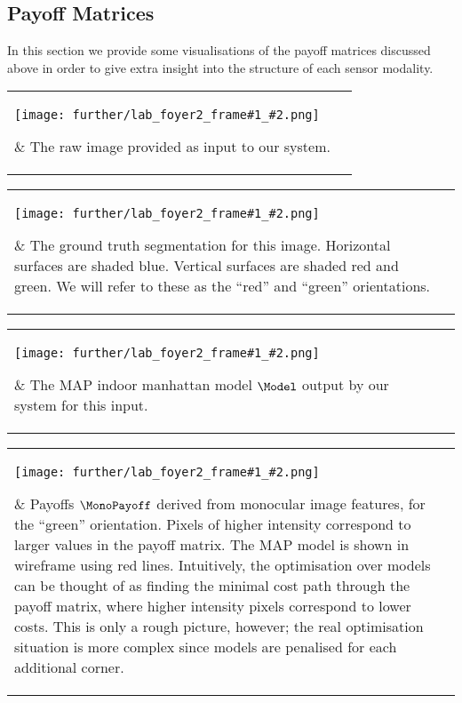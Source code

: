 \subsection{Payoff Matrices}

In this section we provide some visualisations of the payoff matrices
discussed above in order to give extra insight into the structure of
each sensor modality.

\newcommand\FooPayoffImg[2]{
        \parbox[c]{1em}{
                \texttt{[image: further/lab\_foyer2\_frame\#1\_\#2.png]}}}
\newcommand\PayoffImg[1]{\FooPayoffImg{010}{#1}}


\begin{tabular}{IT}
  \PayoffImg{orig} &
  The raw image provided as input to our system. \\
\end{tabular}
\qquad

\begin{tabular}{IT}
  \PayoffImg{gt} &
  The ground truth segmentation for this image. Horizontal surfaces
  are shaded blue. Vertical surfaces are shaded red and green. We will
  refer to these as the ``red'' and ``green'' orientations.\\
\end{tabular}
\qquad

\begin{tabular}{IT}
  \PayoffImg{dp} &
  The MAP indoor manhattan model $\Model$ output by our system for
  this input. \\
\end{tabular}
\qquad

\begin{tabular}{IT}
  \PayoffImg{monopayoffs0} &
  Payoffs $\MonoPayoff$ derived from monocular image features, for the
  ``green'' orientation. Pixels of higher intensity correspond to
  larger values in the payoff matrix. The MAP model is shown in
  wireframe using red lines. Intuitively, the optimisation over models
  can be thought of as finding the minimal cost path through the
  payoff matrix, where higher intensity pixels correspond to lower
  costs. This is only a rough picture, however; the real optimisation
  situation is more complex since models are penalised for each
  additional corner. \\
\end{tabular}
\qquad

